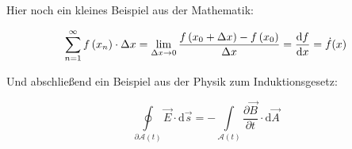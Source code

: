 Hier noch ein kleines Beispiel aus der Mathematik:

\begin{equation}
\sum\limits_{n=1}^\infty f\left(x_n\right)\cdot \Delta x=  \lim\limits_{\Delta x \rightarrow 0} \frac{f\left(x_0+\Delta x\right)-f\left(x_0\right)}{\Delta x} = \frac{\mathop{}\!\mathrm{d} f}{\mathop{}\!\mathrm{d} x} = \dot{f}(x)
\end{equation}

Und abschließend ein Beispiel aus der Physik zum Induktionsgesetz:

\begin{equation}
\oint \limits _{\partial {\mathcal {\mathcal {A}}}(t)}{{\vec {E}}\cdot {\text{d}}{\vec {s}}}=-\int \limits _{{\mathcal {A}}(t)}{{\frac {\partial {\vec {B}}}{\partial t}}\cdot {\text{d}}{\vec {A}}}
\end{equation}

